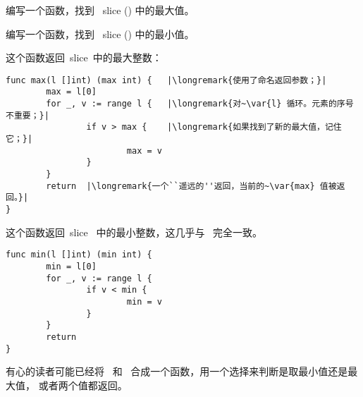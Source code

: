 \begin{Exercise}[title={最小值和最大值},difficulty=0]
\label{ex:minmax}
\Question\label{ex:minmax q1} 编写一个函数，找到~ slice () 中的最大值。

\Question\label{ex:minmax q2} 编写一个函数，找到~ slice () 中的最小值。

\end{Exercise}

\begin{Answer}
\Question 这个函数返回~slice~中的最大整数：
\begin{lstlisting}
func max(l []int) (max int) {   |\longremark{使用了命名返回参数；}|
        max = l[0]      
        for _, v := range l {   |\longremark{对~\var{l} 循环。元素的序号不重要；}|
                if v > max {    |\longremark{如果找到了新的最大值，记住它；}|
                        max = v 
                }   
        }   
        return  |\longremark{一个``遥远的''返回，当前的~\var{max} 值被返回。}|
}
\end{lstlisting}
\showremarks

\Question 这个函数返回~slice~ 中的最小整数，这几乎与~ 完全一致。
\begin{lstlisting}
func min(l []int) (min int) {
        min = l[0]
        for _, v := range l { 
                if v < min {
                        min = v 
                }   
        }   
        return
}
\end{lstlisting}
有心的读者可能已经将~ 和~ 合成一个函数，用一个选择来判断是取最小值还是最大值，
或者两个值都返回。
\end{Answer}
